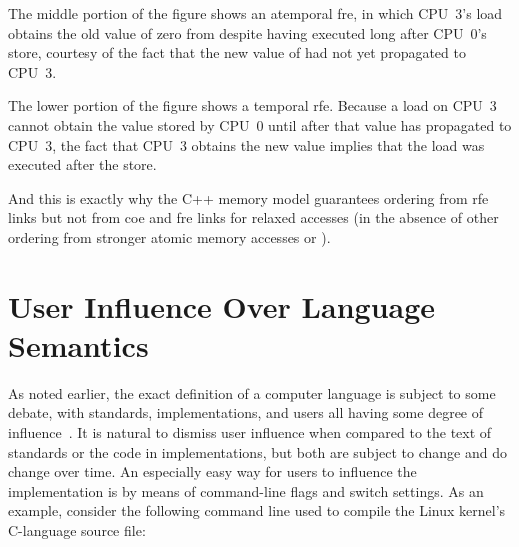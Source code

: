 \documentclass[10]{article}
\begin{document}
The middle portion of the figure shows an atemporal fre, in which
CPU~3's load obtains the old value of zero from  despite
having executed long after CPU~0's store, courtesy of the fact
that the new value of  had not yet propagated to CPU~3.

The lower portion of the figure shows a temporal rfe.
Because a load on CPU~3 cannot obtain the value stored by CPU~0 until
after that value has propagated to CPU~3, the fact that CPU~3 obtains
the new value implies that the load was executed after the store.

And this is exactly why the C++ memory model guarantees ordering from
rfe links but not from coe and fre links for relaxed accesses (in the
absence of other ordering from stronger atomic memory accesses or
).

\clearpage

\section{User Influence Over Language Semantics}
\label{app:User Influence Over Language Semantics}

As noted earlier, the exact definition of a computer language is subject
to some debate, with standards, implementations, and users all having
some degree of
influence~\cite{KayvanMemarian2016DepthOfC-1,KayvanMemarian2016DepthOfC-2}.
It is natural to dismiss user influence when compared to the text of
standards or the code in implementations, but both are subject to
change and do change over time.
An especially easy way for users to influence the implementation is by
means of command-line flags and switch settings.
As an example,
consider the following command line used to compile the Linux kernel's
 C-language source file:
\end{document}
